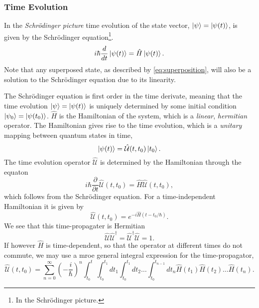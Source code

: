     \subsubsection{Time Evolution}
    In the \emph{Schrödinger picture}
    time evolution of the state vector, $\ket{\psi} = \ket{\psi (t)}$, is given by the Schrödinger
    equation\footnote{In the Schrödinger picture.}.
    \begin{equation}
        i\hbar \frac{d}{dt} \ket{\psi (t)} = \hat{H} \ket{\psi (t)}.
    \end{equation}
    Note that any superposed state, as described by \ref{eq:superposition}, will also be 
    a solution to the Schrödinger equation due to its linearity.

    The Schrödinger equation is first order in the time derivate, meaning that the time 
    evolution $\ket{\psi} = \ket{\psi(t)}$ is uniquely determined by some initial 
    condition $\ket{\psi_0} = \ket{\psi(t_0)}$. $\hat{H}$ is the Hamiltonian of the system,
    which is a \emph{linear}, \emph{hermitian} operator. The Hamiltonian gives rise to the 
    time evolution, which is a \emph{unitary} mapping between quantum states in time,
    \begin{equation}
        \ket{\psi(t)} =  \hat{\mathcal{U}}(t, t_0) \ket{t_0}.
    \end{equation}
    The time evolution operator $\hat{\mathcal{U}}$ is determined by the Hamiltonian 
    through the equaton 
    \begin{equation}
        i\hbar \frac{\partial}{\partial t} \hat{\mathcal{U}}(t, t_0)
            = \hat{H}\hat{\mathcal{U}}(t, t_0),
    \end{equation}
    which follows from the Schrödinger equation. For a time-independent 
    Hamiltonian it is given by 
    \begin{equation}
        \hat{\mathcal{U}}(t, t_0) = e^{-i \hat{H}(t - t_0/\hbar)}.
    \end{equation}
    We see that this time-propagater is Hermitian 
    \begin{equation}
        \hat{\mathcal{U}}\hat{\mathcal{U}}^\dagger 
        = \hat{\mathcal{U}}^\dagger \hat{\mathcal{U}} = 1.
    \end{equation}
    If however $\hat{H}$ is time-dependent, so that the operator at different times do 
    not commute, we may use a mroe general integral expression for the time-propagator,
    \begin{equation}
        \hat{\mathcal{U}}(t, t_0)
         = \sum_{n=0}^\infty (-\frac{i}{\hbar})^n
            \int_{t_0}^t \int_{t_0}^{t_1}dt_1 \int_{t_0}^{t_1}dt_2 \dots \int_{t_0}^{t_{n-1}}
                dt_n \hat{H}(t_1)\hat{H}(t_2) \dots \hat{H}(t_n).
    \end{equation}

